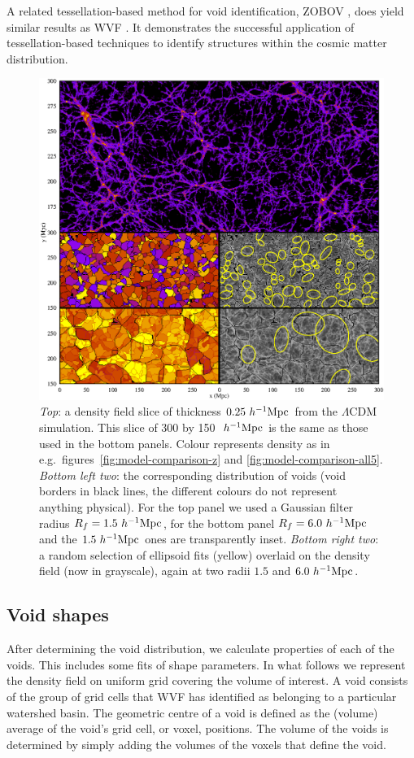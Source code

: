 A related tessellation-based method for void identification, ZOBOV \citep{neyrinck08}, 
does yield similar results as WVF \citep{colberg08}. It demonstrates the successful 
application of tessellation-based techniques to identify structures within the cosmic 
matter distribution.

\begin{figure}
\includegraphics[width=\textwidth]{ch_voidsde/img/voidOverlayEllipses}
\caption{\textit{Top}: a density field slice of thickness $0.25~h^{-1} {\rm Mpc}$ from the $\Lambda$CDM simulation. This slice of 300 by 150 $~h^{-1} {\rm Mpc}$ is the same as those used in the
bottom panels. Colour represents density as in e.g.\ figures~\ref{fig:model-comparison-z} and \ref{fig:model-comparison-all5}.
\textit{Bottom left two}: the corresponding distribution of voids 
(void borders in black lines, the different colours do not represent anything physical). For the top panel we used a Gaussian filter 
radius $R_f = 1.5 ~h^{-1} {\rm Mpc}$, for the bottom panel $R_f = 6.0 ~h^{-1} {\rm Mpc}$ and the $1.5~h^{-1} {\rm Mpc}$ ones are transparently inset. \textit{Bottom right two}: a 
random selection of ellipsoid fits (yellow) overlaid on the density field (now in grayscale), again at two radii $1.5$ and $6.0~h^{-1} {\rm Mpc}$.}
\label{fig:watershedWMAP}
\end{figure}

\subsection{Void shapes}
\label{sec:voidProperties}
After determining the void distribution, we calculate properties of each of the voids. This includes some fits of shape 
parameters. In what follows we represent the density field on uniform grid covering the volume of interest. A void 
consists of the group of grid cells that WVF has identified as belonging to a particular watershed basin. 
The geometric centre of a void is defined as the (volume) average of the void's grid cell, or voxel, positions.
The volume of the voids is determined by simply adding the volumes of the voxels that define the void. 

